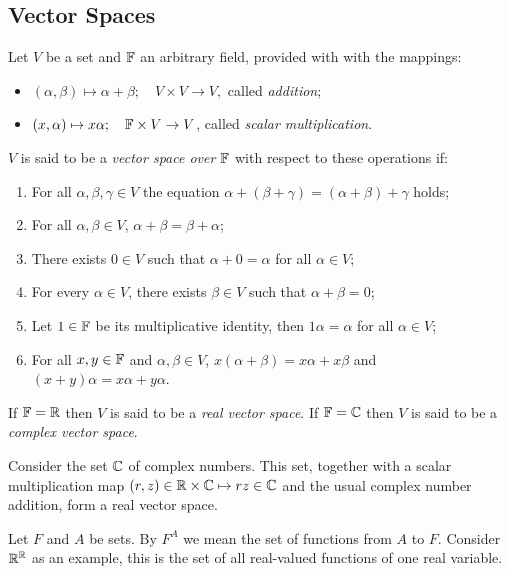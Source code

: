 \subsection{Vector Spaces}
\begin{definition}
	Let $V$ be a set and $\mathbb{F}$ an arbitrary field, provided with with the mappings:
	\begin{itemize}
		\item
			$(\alpha, \beta) \mapsto \alpha + \beta; \quad V \times V \to V,$ called \emph{addition};
		\item
			$(x, \alpha) \mapsto x\alpha; \quad \mathbb{F} \times V \to V$, called \emph{scalar multiplication}.
	\end{itemize}
	$V$ is said to be a \emph{vector space over $\mathbb{F}$} with respect to these operations if:
	\begin{enumerate}
		\item
			For all $\alpha, \beta, \gamma \in V$ the equation $\alpha + (\beta + \gamma) = (\alpha + \beta) + \gamma$ holds;
		\item
			For all $\alpha, \beta \in V$, $\alpha + \beta = \beta + \alpha$;
		\item
			There exists $0 \in V$ such that $\alpha + 0 = \alpha$ for all $\alpha \in V$;
		\item
			For every $\alpha \in V$, there exists $\beta \in V$ such that $\alpha + \beta = 0$;
		\item
			Let $1 \in \mathbb{F}$ be its multiplicative identity, then $1 \alpha = \alpha$ for all $\alpha \in V$;
		\item
			For all $x,y \in \mathbb{F}$ and $\alpha, \beta \in V$, $x(\alpha + \beta) = x\alpha + x\beta$ and $(x+y) \alpha = x \alpha + y \alpha$.
	\end{enumerate}
	If $\mathbb{F} = \mathbb{R}$ then $V$ is said to be a \emph{real vector space}. If $\mathbb{F} = \mathbb{C}$ then $V$ is said to be a \emph{complex vector space}. 
\end{definition}

\begin{example}
	Consider the set $\mathbb{C}$ of complex numbers. This set, together with a scalar multiplication map $(r, z) \in \mathbb{R} \times \mathbb{C} \mapsto rz \in \mathbb{C}$ and the usual complex number addition, form a real vector space.
\end{example}

\begin{notation}
	Let $F$ and $A$ be sets. By $F^A$ we mean the set of functions from $A$ to $F$. Consider $\mathbb{R}^{\mathbb{R}}$ as an example, this is the set of all real-valued functions of one real variable.
\end{notation}

